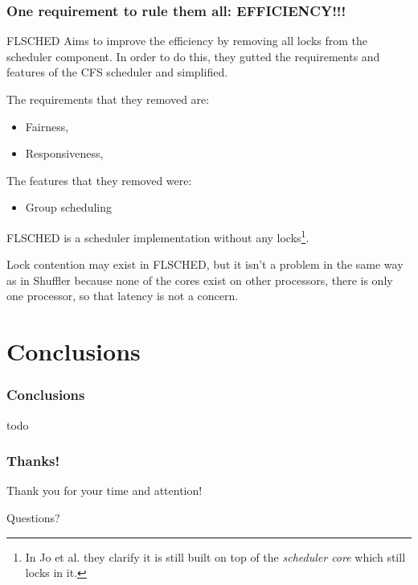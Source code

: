 \documentclass{beamer}
\newcommand{\linespace}{\vskip 0.25cm}
\begin{document}
\begin{frame}
\frametitle{One requirement to rule them all: EFFICIENCY!!!}

FLSCHED Aims to improve the efficiency by removing all locks from the scheduler component. In order to do this, they gutted the requirements and features of the CFS scheduler and simplified.

\linespace

The requirements that they removed are:

\begin{itemize}
\item Fairness,
\item Responsiveness,
\end{itemize}

The features that they removed were:

\begin{itemize}
\item Group scheduling
\end{itemize}

\end{frame}

\begin{frame}
FLSCHED is a scheduler implementation without any locks\footnote{In Jo et al. they clarify it is still built on top of the \emph{scheduler core} which still locks in it.}.

\linespace
Lock contention may exist in FLSCHED, but it isn't a problem in the same way as in Shuffler because none of the cores exist on other processors, there is only one processor, so that latency is not a concern.

\end{frame}

\section[Conclusions]{Conclusions}

\begin{frame}
\frametitle{Conclusions}

todo

\end{frame}

\begin{frame}
\frametitle{Thanks!}

Thank you for your time and attention!

\begin{center}
{\huge Questions?}
\end{center}
\end{frame}
\end{document}
